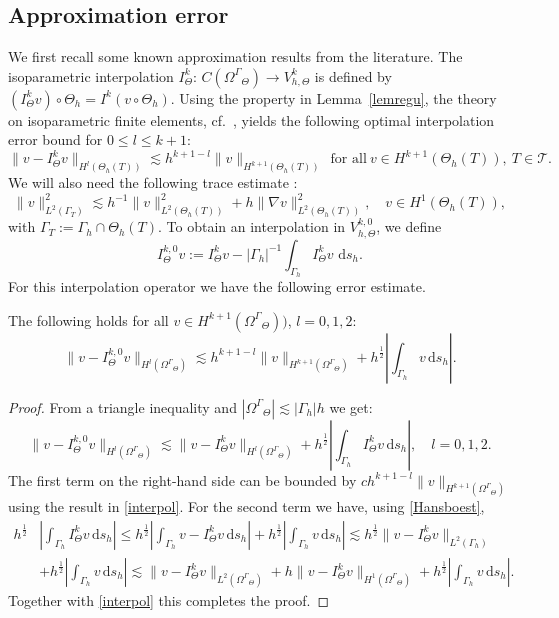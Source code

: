 \documentclass[final]{siamltex}
\begin{document}
\subsection{Approximation error}
We first recall some known approximation results from the literature. The isoparametric interpolation ${I_{\Theta}^k}:\, C({\Omega^{\Gamma}}_\Theta) \to {V_{h,\Theta}^k}$ is defined by $({I_{\Theta}^k} v)\circ \Theta_h= {I^k}(v\circ \Theta_h)$. Using the property in Lemma~\ref{lemregu}, the theory on isoparametric finite elements, cf.~\cite{Lenoir86},
yields the following optimal interpolation error bound for $0 \leq l \leq k+1$:
\begin{equation} \label{interpol}
 \|v - {I_{\Theta}^k} v\|_{H^l(\Theta_h(T))} \lesssim h^{k+1-l} \|v\|_{H^{k+1}(\Theta_h(T))} ~~ \text{for all}~v \in H^{k+1}(\Theta_h(T)), ~T \in {\mathcal{T}}.
\end{equation}
We will also need the following trace estimate \cite{hansbo2002unfitted}:
\begin{equation} \label{Hansboest}
\|v\|_{L^2(\Gamma_T)}^2 \lesssim h^{-1} \|v\|_{L^2(\Theta_h(T))}^2 + h \|\nabla v\|_{L^2(\Theta_h(T))}^2, \quad v \in H^1(\Theta_h(T)),
\end{equation}
with $\Gamma_T:=\Gamma_h \cap \Theta_h(T)$.
To obtain an interpolation in ${V_{h,\Theta}^{k,0}}$, we define 
\[
 {I_{\Theta}^{k,0}} v := {I_{\Theta}^k} v - |\Gamma_h|^{-1} \int_{\Gamma_h} {I_{\Theta}^k} v \, {\,\mathrm{d} {s_h}}.
\]
For this interpolation operator we have the following error estimate.
\begin{lemma} \label{lemintb} The following holds for all $v \in H^{k+1}({\Omega^{\Gamma}}_\Theta))$, $l=0,1,2$:
\[
  \| v - {I_{\Theta}^{k,0}} v \|_{H^l({\Omega^{\Gamma}}_\Theta)} \lesssim h^{k+1-l} \|v\|_{H^{k+1}({\Omega^{\Gamma}}_\Theta)} + h^\frac12 \left|\int_{\Gamma_h} v {\,\mathrm{d} {s_h}} \right|.
\]
\end{lemma}
\begin{proof}
From a triangle inequality and $|{\Omega^{\Gamma}}_\Theta| \lesssim | \Gamma_h | h$ we get: 
\[
  \| v - {I_{\Theta}^{k,0}} v \|_{H^l({\Omega^{\Gamma}}_\Theta)} \lesssim \| v - {I_{\Theta}^k} v \|_{H^l({\Omega^{\Gamma}}_\Theta)} + h^\frac12 \left\vert \int_{\Gamma_h} {I_{\Theta}^k} v {\,\mathrm{d} {s_h}} \right\vert, \quad l=0,1,2.
\]
The first term on the right-hand side can be bounded by $ch^{k+1-l} \|v\|_{H^{k+1}({\Omega^{\Gamma}}_\Theta)}$ using the result in \eqref{interpol}.
For the second term we have, using \eqref{Hansboest}, 
\begin{align*}
 h^\frac12 & \left\vert \int_{\Gamma_h} {I_{\Theta}^k} v {\,\mathrm{d} {s_h}} \right\vert 
\leq 
h ^\frac12 \left|\int_{\Gamma_h} v - {I_{\Theta}^k} v {\,\mathrm{d} {s_h}} \right| + h^\frac12 \left|\int_{\Gamma_h} v {\,\mathrm{d} {s_h}} \right| \lesssim h^\frac12 \| v - {I_{\Theta}^k} v \|_{L^2(\Gamma_h)} \\
 & + h^\frac12 \left|\int_{\Gamma_h} v {\,\mathrm{d} {s_h}} \right| \lesssim \| v - {I_{\Theta}^k} v \|_{L^2({\Omega^{\Gamma}}_\Theta)} + h \| v - {I_{\Theta}^k} v \|_{H^1({\Omega^{\Gamma}}_\Theta)}+ h^\frac12 \left|\int_{\Gamma_h} v {\,\mathrm{d} {s_h}} \right|.
\end{align*}
Together with \eqref{interpol} this completes the proof.
\end{proof}
\end{document}
